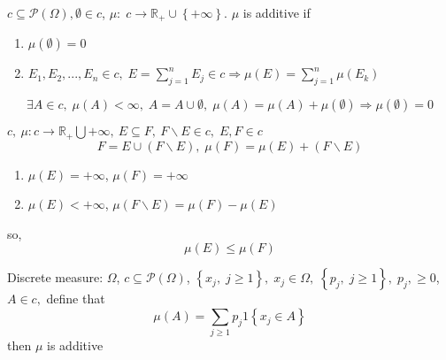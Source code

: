 \begin{definition}
	$ c \subseteq\mathcal{P}\left(\Omega\right), \emptyset \in c $, $\mu :\;c \to {\mathbb{R}_ + } \cup \left\{ { + \infty } \right\}$. $ \mu $ is additive if 
	\begin{enumerate}
		\item $\mu \left( \emptyset  \right) = 0$
		\item ${E_1},{E_2},...,{E_n} \in c,\;E = \sum\limits_{j = 1}^n {{E_j}}  \in c \Rightarrow \mu \left( E \right) = \sum\limits_{j = 1}^n {\mu \left( {{E_k}} \right)} $
	\end{enumerate}
	\label{def2.6}
\end{definition}

\begin{remark}
	\begin{equation}
	\exists A \in c,\;\mu \left( A \right) < \infty ,\;A = A \cup \emptyset ,\;\mu \left( A \right) = \mu \left( A \right) + \mu \left( \emptyset  \right) \Rightarrow \mu \left( \emptyset  \right) = 0
	\label{eq2.7}
	\end{equation}
	\label{rmk2.8}
\end{remark}

\begin{remark}
	$ c,\  \mu: c \to \mathbb{R}_{+} \bigcup {+ \infty}, \  E \subseteq F, \ F\backslash E \in c,\;E,F \in c $
	\begin{equation}
	F = E \cup \left( {F\backslash E} \right),\;\mu \left( F \right) = \mu \left( E \right) + \left( {F\backslash E} \right)
	\label{eq2.8}
	\end{equation}
	\begin{enumerate}
		\item $\mu \left( E \right) =  + \infty $, $\mu \left( F \right) =  + \infty $
		\item $\mu \left( E \right) <  + \infty $, $\mu \left( {F\backslash E} \right) = \mu \left( F \right) - \mu \left( E \right)$
	\end{enumerate}
	so, 
	\begin{equation}
	\mu \left( E \right) \leqslant \mu \left( F \right)
	\label{eq2.9}
	\end{equation}
	\label{rmk2.9}
\end{remark}

\begin{example}
	Discrete measure:
	$ \Omega $, $ c \subseteq  \mathcal{P}\left(\Omega\right) $, $\left\{ {{x_j},\;j \geqslant 1} \right\},\;{x_j} \in \Omega ,\;\left\{ {{p_j},\;j \geqslant 1} \right\},\;{p_j},  \geqslant 0$, $ A \in c, $ define that
	\begin{equation}
	\mu \left( A \right) = \sum\limits_{j \geqslant 1} {{p_j}} 1\left\{ {{x_j} \in A} \right\}
	\end{equation}
	then $ \mu $ is additive
	\label{eg2.3}
\end{example}

